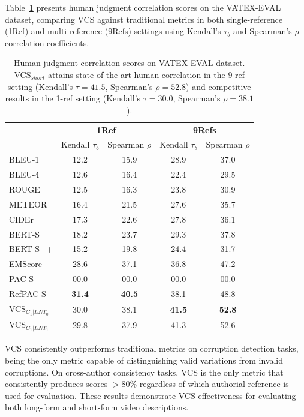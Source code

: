 \documentclass[main.tex]{subfiles}
\begin{document}
Table~\ref{tab:vatex-eval} presents human judgment correlation scores on the VATEX-EVAL dataset, comparing VCS against traditional metrics in both single-reference (1Ref) and multi-reference (9Refs) settings using Kendall's $\tau_b$ and Spearman's $\rho$ correlation coefficients.

\begin{table}[t]
  \centering
  \normalsize
  \setlength{\tabcolsep}{0.75mm}
  \begin{tabular}{l@{\hspace{0.1mm}}cccc}
    \hline
    & \multicolumn{2}{c}{\textbf{1Ref}} & \multicolumn{2}{c}{\textbf{9Refs}} \\
    \cline{2-3} \cline{4-5}
    & Kendall $\tau_b$ & Spearman $\rho$ & Kendall $\tau_b$ & Spearman $\rho$ \\
    \hline
    BLEU-1 & 12.2 & 15.9 & 28.9 & 37.0 \\
    BLEU-4 & 12.6 & 16.4 & 22.4 & 29.5 \\
    ROUGE & 12.5 & 16.3 & 23.8 & 30.9 \\
    METEOR & 16.4 & 21.5 & 27.6 & 35.7 \\
    CIDEr & 17.3 & 22.6 & 27.8 & 36.1 \\
    \hline
    BERT-S & 18.2 & 23.7 & 29.3 & 37.8 \\
    BERT-S++ & 15.2 & 19.8 & 24.4 & 31.7 \\
    \hline
    EMScore & 28.6 & 37.1 & 36.8 & 47.2 \\
    PAC-S & 00.0 & 00.0 & 00.0 & 00.0 \\
    RefPAC-S & \textbf{31.4} & \textbf{40.5} & 38.1 & 48.8 \\
    \hline
    VCS$_{C_1|LNT_0}$ & 30.0 & 38.1 & \textbf{41.5} & \textbf{52.8} \\
    VCS$_{C_1|LNT_1}$ & 29.8 & 37.9 & 41.3 & 52.6 \\
    \hline
  \end{tabular}
  \caption{Human judgment correlation scores on VATEX-EVAL dataset. VCS$_{short}$ attains state-of-the-art human correlation in the 9-ref setting (Kendall's $\tau = 41.5$, Spearman's $\rho = 52.8$) and competitive results in the 1-ref setting (Kendall's $\tau = 30.0$, Spearman's $\rho = 38.1$).}
  \label{tab:vatex-eval}
\end{table}

VCS consistently outperforms traditional metrics on corruption detection tasks, being the only metric capable of distinguishing valid variations from invalid corruptions. On cross-author consistency tasks, VCS is the only metric that consistently produces scores $>$80\% regardless of which authorial reference is used for evaluation. These results demonstrate VCS effectiveness for evaluating both long-form and short-form video descriptions.
\end{document}
